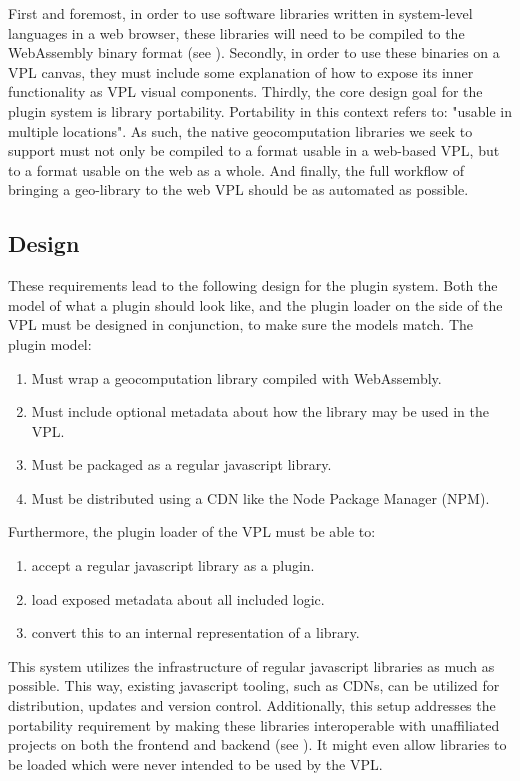 First and foremost, in order to use software libraries written in system-level languages in a web browser, these libraries will need to be compiled to the WebAssembly binary format (see ). 
Secondly, in order to use these binaries on a VPL canvas, they must include some explanation of how to expose its inner functionality as VPL visual components.
Thirdly, the core design goal for the plugin system is library portability.
Portability in this context refers to: "usable in multiple locations".
As such, the native geocomputation libraries we seek to support must not only be compiled to a format usable in a web-based VPL, but to a format usable on the web as a whole. 
And finally, the full workflow of bringing a geo-library to the web VPL should be as automated as possible. 

\newpage
\subsection{Design}

These requirements lead to the following design for the plugin system.
Both the model of what a plugin should look like, and the plugin loader on the side of the VPL must be designed in conjunction, to make sure the models match.  
The plugin model:
\begin{enumerate}[-]
  \item Must wrap a geocomputation library compiled with WebAssembly.
  \item Must include optional metadata about how the library may be used in the VPL.
  \item Must be packaged as a regular javascript library.
  \item Must be distributed using a \ac{CDN} like the Node Package Manager (NPM).
\end{enumerate}

Furthermore, the plugin loader of the VPL must be able to: 
\begin{enumerate}[-]
  \item accept a regular javascript library as a plugin. 
  \item load exposed metadata about all included logic.
  \item convert this to an internal representation of a library.
\end{enumerate}

This system utilizes the infrastructure of regular javascript libraries as much as possible. 
This way, existing javascript tooling, such as \ac{CDN}s, can be utilized for distribution, updates and version control.
Additionally, this setup addresses the portability requirement by making these libraries interoperable with unaffiliated projects on both the frontend and backend (see ).
It might even allow libraries to be loaded which were never intended to be used by the VPL.

